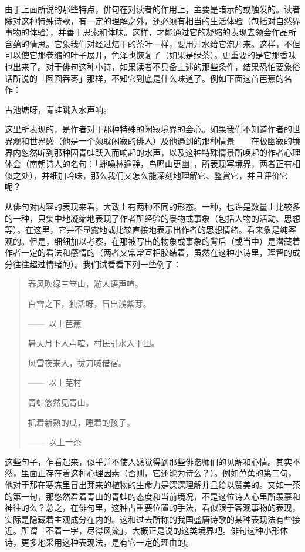 {    由于上面所说的那些特点，俳句在对读者的作用上，主要是暗示的或触发的。读者除对这种特殊诗歌，有一定的理解之外，还必须有相当的生活体验（包括对自然界事物的体验），并善于思索和体味。这样，才能通过它的凝缩的表现去领会作品所含蕴的情思。它象我们对经过焙干的茶叶一样，要用开水给它泡开来。这样，不但可以使它那卷缩的叶子展开，色泽也恢复了（如果是绿茶）。更重要的是它那香味也出来了。对于俳句这种小诗，如果读者不具备上述的那些条件，结果恐怕要象俗话所说的「囫囵吞枣」那样，不知它到底是什么味道了。例如下面这首芭蕉的名作：

    \begin{center}
        古池塘呀，青蛙跳入水声响。\footnotemark[1]
    \end{center}


    这里所表现的，是作者对于那种特殊的闲寂境界的会心。如果我们不知道作者的世界观和世界感（他是一个颇耽闲寂的俳人）及他遇到的那种情景——在极幽寂的境界内忽然听到那种因青蛙跃入而响起的水声，以及这种特殊情景所唤起的作者心理体会（南朝诗人的名句：「蝉噪林逾静，鸟鸣山更幽」，所表现写境界，两者正有相似之处），并细加吟味，那么我们又怎么能深刻地理解它、鉴赏它，并且评价它呢？

    从俳句对内容的表现来看，大致上有两种不同的形态。一种，也许是数量上比较多的一种，只集中地凝缩地表现了作者所经验的景物或事象（包括人物的活动、思想等）。在这里，它并不显露地或比较直接地表示出作者的思想情绪。看来象是纯客观的。但是，细细加以考察，在那被写出的物象或事象的背后（或当中）是潜藏着作者一定的看法和感情的（两者又常常互相胶结着，虽然在这种小诗里，理智的成分往往超过情绪的）。我们试看看下列一些例子：
    \begin{quote}
        春风吹绿三笠山，游人语声喧。

        白雪之下，独活呀，冒出浅紫芽。

        \hfill——~以上芭蕉

        暑天月下人声喧，村民引水入干田。

        风雪夜来人，拔刀喊借宿。

        \hfill ——~以上芜村

        青蛙悠然见青山。

        抓着新熟的瓜，睡着的孩子。

        \hfill ——~以上一茶
    \end{quote}

    这些句子，乍看起来，似乎并不使人感觉得到那些俳谐师们的见解和心情。其实不然，里面正存在着这种心理因素（否则，它还能为诗么？）。例如芭蕉的第二句，他对于那在寒冻里冒出芽来的植物的生命力是深深理解并且给以赞美的。又如一茶的第一句，那悠然看着青山的青蛙的态度和当前境况，不是这位诗人心里所羡慕和神往的么？总之，在俳句里，这种占重要位置的手法，看似限于客观事物的表现，实际是隐藏着主观成分在内的。这和过去所称的我国盛唐诗歌的某种表现法有些接近。所谓「不着一字，尽得风流」，大概正是说的这类境界吧。俳句这种小形体诗，更多地采用这种表现法，是有它一定的理由的。

}
